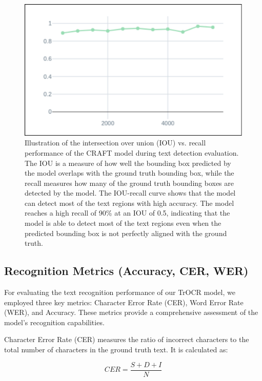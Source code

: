 \begin{figure}[ht]
    \centering
    \includegraphics[width=\textwidth]{figures/iou_craft.png}
    \caption{Illustration of the intersection over union (IOU) vs. recall performance of the CRAFT model 
    during text detection evaluation. The IOU is a measure of how well the bounding box predicted 
    by the model overlaps with the ground truth bounding box, while the recall measures how many of 
    the ground truth bounding boxes are detected by the model. The IOU-recall curve shows that the 
    model can detect most of the text regions with high accuracy. The model reaches a high recall of 
    90\% at an IOU of 0.5, indicating that the model is able to detect most of the text regions even 
    when the predicted bounding box is not perfectly aligned with the ground truth.}
    \label{fig:iou-recall-craft}
\end{figure}


\subsection{Recognition Metrics (Accuracy, CER, WER)}
\label{subsec:recognition-metrics}
For evaluating the text recognition performance of our TrOCR model, we employed three key metrics: Character Error Rate (CER), Word Error Rate (WER), and Accuracy. These metrics provide a comprehensive assessment of the model's recognition capabilities.

Character Error Rate (CER) measures the ratio of incorrect characters to the total number of characters in the ground truth text. It is calculated as:

\begin{equation}
    CER = \frac{S + D + I}{N}
\end{equation}

